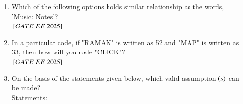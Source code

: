 \documentclass[journal,12pt,onecolumn]{IEEEtran}
\theoremstyle{remark}
\begin{document}
\begin{enumerate}
   \item Which of the following options holds similar relationship as the words, 'Music: Notes'?  \\   
\hfill ${}\left[GATE\ EE\ 2025\right]$
    \begin{enumerate}
        \end{enumerate}

   \item In a particular code, if "RAMAN" is written as 52 and "MAP" is written as 33, then how will you code "CLICK"?  \\   
\hfill ${}\left[GATE\ EE\ 2025\right]$
    \begin{enumerate}
    \end{enumerate}

   \item On the basis of the statements given below, which valid assumption $\left(s\right)$ can be
made? \\  
      Statements:
\begin{enumerate}


\end{enumerate}
\end{enumerate}
\end{document}
